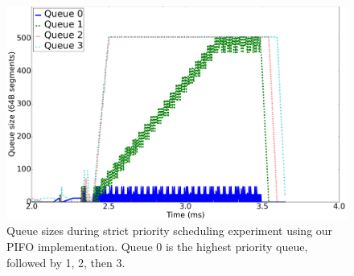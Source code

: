 \begin{figure}[!ht]
\includegraphics[width=1\linewidth]{figures/eval/strict_queues}
\caption{Queue sizes during strict priority scheduling experiment using our PIFO implementation. Queue 0 is the highest priority queue, followed by 1, 2, then 3.}
\label{fig:strict_queues}
\end{figure}
\





